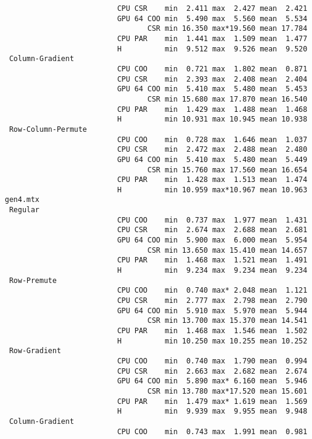 \begin{verbatim}
                          CPU CSR    min  2.411 max  2.427 mean  2.421
                          GPU 64 COO min  5.490 max  5.560 mean  5.534
                                 CSR min 16.350 max*19.560 mean 17.784
                          CPU PAR    min  1.441 max  1.509 mean  1.477
                          H          min  9.512 max  9.526 mean  9.520
 Column-Gradient
                          CPU COO    min  0.721 max  1.802 mean  0.871
                          CPU CSR    min  2.393 max  2.408 mean  2.404
                          GPU 64 COO min  5.410 max  5.480 mean  5.453
                                 CSR min 15.680 max 17.870 mean 16.540
                          CPU PAR    min  1.429 max  1.488 mean  1.468
                          H          min 10.931 max 10.945 mean 10.938
 Row-Column-Permute
                          CPU COO    min  0.728 max  1.646 mean  1.037
                          CPU CSR    min  2.472 max  2.488 mean  2.480
                          GPU 64 COO min  5.410 max  5.480 mean  5.449
                                 CSR min 15.760 max 17.560 mean 16.654
                          CPU PAR    min  1.428 max  1.513 mean  1.474
                          H          min 10.959 max*10.967 mean 10.963
gen4.mtx
 Regular
                          CPU COO    min  0.737 max  1.977 mean  1.431
                          CPU CSR    min  2.674 max  2.688 mean  2.681
                          GPU 64 COO min  5.900 max  6.000 mean  5.954
                                 CSR min 13.650 max 15.410 mean 14.657
                          CPU PAR    min  1.468 max  1.521 mean  1.491
                          H          min  9.234 max  9.234 mean  9.234
 Row-Premute
                          CPU COO    min  0.740 max* 2.048 mean  1.121
                          CPU CSR    min  2.777 max  2.798 mean  2.790
                          GPU 64 COO min  5.910 max  5.970 mean  5.944
                                 CSR min 13.700 max 15.370 mean 14.541
                          CPU PAR    min  1.468 max  1.546 mean  1.502
                          H          min 10.250 max 10.255 mean 10.252
 Row-Gradient
                          CPU COO    min  0.740 max  1.790 mean  0.994
                          CPU CSR    min  2.663 max  2.682 mean  2.674
                          GPU 64 COO min  5.890 max* 6.160 mean  5.946
                                 CSR min 13.780 max*17.520 mean 15.601
                          CPU PAR    min  1.479 max* 1.619 mean  1.569
                          H          min  9.939 max  9.955 mean  9.948
 Column-Gradient
                          CPU COO    min  0.743 max  1.991 mean  0.981

\end{verbatim}
